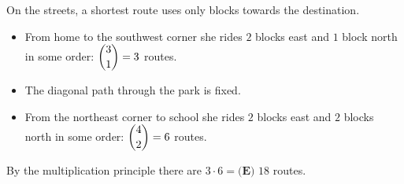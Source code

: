 On the streets, a shortest route uses only blocks towards the destination.
\begin{itemize}
\item From home to the southwest corner she rides $2$ blocks east and $1$ block north in some order: $\dbinom31=3$ routes.
\item The diagonal path through the park is fixed.
\item From the northeast corner to school she rides $2$ blocks east and $2$ blocks north in some order: $\dbinom42=6$ routes.
\end{itemize}
By the multiplication principle there are $3\cdot6=\boxed{\textbf{(E) }18}$ routes.
